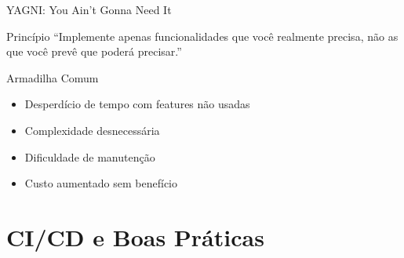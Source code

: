 \documentclass[10pt, aspectratio=169]{beamer}
\begin{document}
\begin{frame}{YAGNI: You Ain't Gonna Need It}
\begin{block}{Princípio}
``Implemente apenas funcionalidades que você realmente precisa, não as que você prevê que poderá precisar.''
\end{block}

\begin{alertblock}{Armadilha Comum}
\begin{itemize}
    \item Desperdício de tempo com features não usadas
    \item Complexidade desnecessária
    \item Dificuldade de manutenção
    \item Custo aumentado sem benefício
\end{itemize}
\end{alertblock}

\begin{center}
\end{center}
\end{frame}

\section{CI/CD e Boas Práticas}
\end{document}
